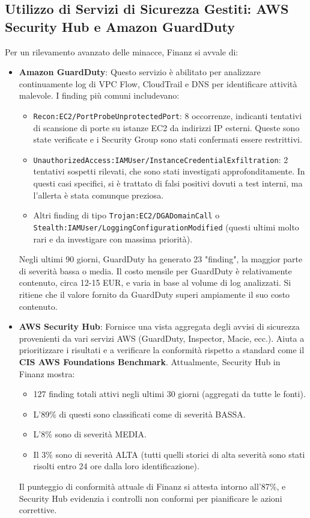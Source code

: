 \subsection{Utilizzo di Servizi di Sicurezza Gestiti: AWS Security Hub e Amazon GuardDuty}
\label{subsec:security-hub-guardduty_cap2}
Per un rilevamento avanzato delle minacce, Finanz si avvale di:
\begin{itemize}
    \item \textbf{Amazon GuardDuty}: Questo servizio è abilitato per analizzare continuamente log di VPC Flow, CloudTrail e DNS per identificare attività malevole.
    I finding più comuni includevano:
        \begin{itemize}
            \item \texttt{Recon:EC2/PortProbeUnprotectedPort}: 8 occorrenze, indicanti tentativi di scansione di porte su istanze EC2 da indirizzi IP esterni. Queste sono state verificate e i Security Group sono stati confermati essere restrittivi.
            \item \texttt{UnauthorizedAccess:IAMUser/\allowbreak{}InstanceCredentialExfiltration}: 2 tentativi sospetti rilevati, che sono stati investigati approfonditamente.
            In questi casi specifici, si è trattato di falsi positivi dovuti a test interni, ma l'allerta è stata comunque preziosa.
            \item Altri finding di tipo \texttt{Trojan:EC2/\allowbreak{}DGADomainCall} o \texttt{Stealth:IAMUser/\allowbreak{}LoggingConfigurationModified} (questi ultimi molto rari e da investigare con massima priorità).
        \end{itemize} Negli ultimi 90 giorni, GuardDuty ha generato 23 "finding", la maggior parte di severità bassa o media. Il costo mensile per GuardDuty è relativamente contenuto, circa 12-15 EUR, e varia in base al volume di log analizzati. Si ritiene che il valore fornito da GuardDuty superi ampiamente il suo costo contenuto.
    \item \textbf{AWS Security Hub}: Fornisce una vista aggregata degli avvisi di sicurezza provenienti da vari servizi AWS (GuardDuty, Inspector, Macie, ecc.). Aiuta a prioritizzare i risultati e a verificare la conformità rispetto a standard come il \textbf{CIS AWS Foundations Benchmark}. Attualmente, Security Hub in Finanz mostra:
    \begin{itemize}
        \item 127 finding totali attivi negli ultimi 30 giorni (aggregati da tutte le fonti).
        \item L'89\% di questi sono classificati come di severità BASSA.
        \item L'8\% sono di severità MEDIA.
        \item Il 3\% sono di severità ALTA (tutti quelli storici di alta severità sono stati risolti entro 24 ore dalla loro identificazione).
    \end{itemize} Il punteggio di conformità attuale di Finanz si attesta intorno all'87\%, e Security Hub evidenzia i controlli non conformi per pianificare le azioni correttive.
\end{itemize}


